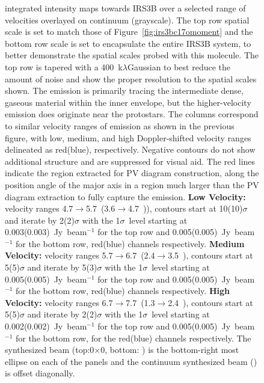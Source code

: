 \begin{figure}[H]
   \caption{\htcop\space integrated intensity maps towards IRS3B over a selected range of velocities overlayed on continuum (grayscale). The top row spatial scale is set to match those of Figure~\ref{fig:irs3bc17omoment} and the bottom row scale is set to encapsulate the entire IRS3B system, to better demonstrate the spatial scales probed with this molecule. The top row is tapered with a 400~k$\lambda$\space Gaussian to best reduce the amount of noise and show the proper resolution to the spatial scales shown. The \htcop\space emission is primarily tracing the intermediate dense, gaseous material within the inner envelope, but the higher-velocity emission does originate near the protostars. The columns correspond to similar velocity ranges of \cso\space emission as shown in the previous figure, with low, medium, and high Doppler-shifted velocity ranges delineated as red(blue), respectively. Negative contours do not show additional structure and are suppressed for visual aid. The red lines indicate the region extracted for PV diagram construction, along the position angle of the major axis in a region much larger than the \cso\space PV diagram extraction to fully capture the emission. \textbf{Low Velocity:} velocity ranges 4.7$\rightarrow$5.7~\kms (3.6$\rightarrow$4.7~\kms)), contours start at 10(10)$\sigma$ and iterate by 2(2)$\sigma$ with the 1$\sigma$~level starting at 0.003(0.003)~Jy~beam$^{-1}$ for the top row and 0.005(0.005)~Jy~beam$^{-1}$ for the bottom row,  red(blue) channels respectively.  \textbf{Medium Velocity:} velocity ranges 5.7$\rightarrow$6.7~\kms (2.4$\rightarrow$3.5~\kms), contours start at 5(5)$\sigma$ and iterate by 5(3)$\sigma$ with the 1$\sigma$~level starting at 0.005(0.005)~Jy~beam$^{-1}$ for the top row and 0.005(0.005)~Jy~beam$^{-1}$ for the bottom row, red(blue) channels respectively. \textbf{High Velocity:} velocity ranges 6.7$\rightarrow$7.7~\kms (1.3$\rightarrow$2.4~\kms), contours start at 5(5)$\sigma$ and iterate by 2(2)$\sigma$ with the 1$\sigma$~level starting at 0.002(0.002)~Jy~beam$^{-1}$ for the top row and 0.005(0.005)~Jy~beam$^{-1}$ for the bottom row, for the red(blue) channels respectively. The \htcop\space synthesized beam (top:0$\times$0, bottom: \htcopbeam) is the bottom-right most ellipse on each of the panels and the continuum synthesized beam (\contbeam) is offset diagonally.}\label{fig:h13copmomentc17o}
\end{figure}


